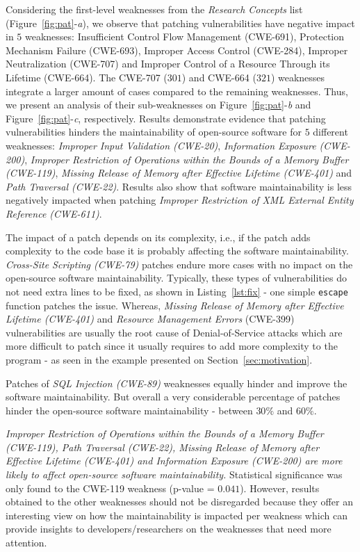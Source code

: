 \documentclass[10pt,conference]{IEEEtran}
\begin{document}
Considering the first-level weaknesses from the \emph{Research Concepts}
list (Figure~\ref{fig:pat}-\emph{a}), we observe that patching vulnerabilities
have negative impact in $5$ weaknesses: Insufficient Control Flow Management 
(CWE-691), Protection Mechanism Failure (CWE-693), Improper Access Control 
(CWE-284), Improper Neutralization (CWE-707) and Improper Control of a Resource 
Through its Lifetime (CWE-664). The CWE-707 ($301$) and CWE-664 ($321$) 
weaknesses integrate a larger amount of cases compared to the remaining 
weaknesses. Thus, we present an analysis of their sub-weaknesses on 
Figure~\ref{fig:pat}-\emph{b} and Figure~\ref{fig:pat}-\emph{c}, respectively. 
Results demonstrate evidence that patching vulnerabilities hinders 
the maintainability of open-source software for $5$ different weaknesses: 
\emph{Improper Input Validation (CWE-20)}, \emph{Information Exposure 
(CWE-200)}, \emph{Improper Restriction of Operations within the Bounds of 
a Memory Buffer (CWE-119)}, \emph{Missing Release of Memory after Effective 
Lifetime (CWE-401)} and \emph{Path Traversal (CWE-22)}. Results also show that 
software maintainability is less negatively impacted when patching 
\emph{Improper Restriction of XML External Entity Reference (CWE-611)}.  

The impact of a patch depends on its complexity, i.e., if the patch
adds complexity to the code base it is probably affecting the software
maintainability. \emph{Cross-Site Scripting (CWE-79)} patches endure more
cases with no impact on the open-source software maintainability.
Typically, these types of vulnerabilities do not need extra lines 
to be fixed, as shown in Listing~\ref{lst:fix} - one simple \texttt{escape} 
function patches the issue.  Whereas, \emph{Missing Release of Memory after Effective 
Lifetime (CWE-401)} and \emph{Resource Management Errors} (CWE-399) vulnerabilities
are usually the root cause of Denial-of-Service attacks which are more difficult
to patch since it usually requires to add more complexity to the program - as
seen in the example presented on Section~\ref{sec:motivation}.



Patches of \emph{SQL Injection
(CWE-89)} weaknesses equally hinder and improve the software maintainability. 
But overall a very considerable percentage of patches hinder the open-source 
software maintainability - between $30\%$ and $60\%$. 

\textit{Improper Restriction of Operations within the Bounds of 
a Memory Buffer (CWE-119), Path Traversal (CWE-22), Missing Release of Memory after Effective 
Lifetime (CWE-401) and \emph{Information Exposure 
(CWE-200)} are more likely to affect open-source software maintainability.}
Statistical significance was only found to the CWE-119 weakness (p-value = 
$0.041$). However, results obtained to the other weaknesses should not be 
disregarded because they offer an interesting view on how the maintainability 
is impacted per weakness which can provide insights to developers/researchers
on the weaknesses that need more attention.
\end{document}
